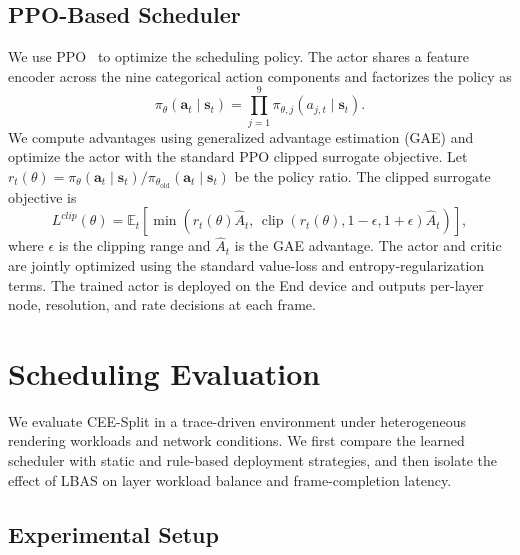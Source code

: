 \documentclass[acmsmall]{acmart}
\begin{document}
	\subsection{PPO-Based Scheduler}

	We use PPO~\cite{schulman_proximal_2017} to optimize the scheduling policy. The actor shares a feature encoder across the nine categorical action components and factorizes the policy as
	\begin{equation}
		\pi_{\theta}(\mathbf{a}_t\mid\mathbf{s}_t)
		=\prod_{j=1}^{9}\pi_{\theta,j}(a_{j,t}\mid\mathbf{s}_t).
		\label{eq:factorized_policy}
	\end{equation}
	We compute advantages using generalized advantage estimation (GAE) and optimize the actor with the standard PPO clipped surrogate objective. Let
	$r_t(\theta)=\pi_{\theta}(\mathbf{a}_t\mid\mathbf{s}_t)/
	\pi_{\theta_{\mathrm{old}}}(\mathbf{a}_t\mid\mathbf{s}_t)$ be the policy ratio. The clipped surrogate objective is
	\begin{equation}
		L^{clip}(\theta)=\mathbb{E}_t\!\left[
		\min\!\left(r_t(\theta)\widehat A_t,\,
		\operatorname{clip}(r_t(\theta),1-\epsilon,1+\epsilon)\widehat A_t\right)
		\right],
		\label{eq:ppo_clip}
	\end{equation}
	where $\epsilon$ is the clipping range and $\widehat A_t$ is the GAE advantage. The actor and critic are jointly optimized using the standard value-loss and entropy-regularization terms. The trained actor is deployed on the End device and outputs per-layer node, resolution, and rate decisions at each frame.
	
	\section{Scheduling Evaluation}
	\label{sec:control_plane}
	We evaluate CEE-Split in a trace-driven environment under heterogeneous rendering workloads and network conditions. We first compare the learned scheduler with static and rule-based deployment strategies, and then isolate the effect of LBAS on layer workload balance and frame-completion latency.

	\subsection{Experimental Setup}
	\label{sec:training_setup}
\end{document}
